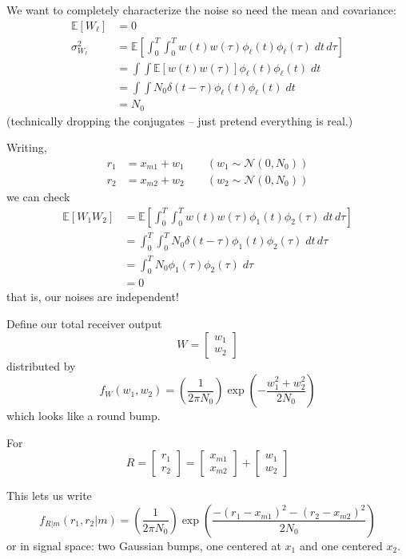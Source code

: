\documentclass[12pt]{report}
\newcommand{\E}{\mathbb{E}}
\newcommand{\Nc}{\mathcal{N}}
\begin{document}
We want to completely characterize the noise so need the mean and covariance: 
\begin{align*}
    \E[W_{\ell}] &= 0\\ 
    \sigma_{W_{\ell}}^2 &= \E\left[\int_0^T \int_0^T w(t) w(\tau)\phi_{\ell}(t) \phi_{\ell}(\tau) \; dt\, d\tau\right]\\ 
    &= \int \int \E[w(t) w(\tau)] \phi_{\ell}(t) \phi_{\ell}(t)\; dt\\ 
    &= \int \int N_0 \delta(t - \tau) \phi_{\ell}(t) \phi_{\ell}(t)\; dt\\
    &= N_0
\end{align*}
(technically dropping the conjugates -- just pretend everything is real.) 

Writing, 
\begin{align*}
    r_1 &= x_{m1} + w_1 \qquad (w_1 \sim \Nc(0, N_0))\\ 
    r_2 &= x_{m2} + w_2 \qquad (w_2 \sim \Nc(0, N_0))
\end{align*}
we can check 
\begin{align*}
    \E[W_1 W_2] &= \E\left[\int_0^T \int_0^T w(t) w(\tau) \phi_1(t) \phi_2(\tau)\; dt\, d\tau\right]\\ 
    &= \int_0^T \int_0^T N_0\delta(t - \tau) \phi_1(t) \phi_2(\tau)\; dt\, d\tau\\ 
    &= \int_0^T N_0 \phi_1(\tau) \phi_2(\tau)\; d\tau\\ 
    &= 0
\end{align*}
that is, our noises are independent!

Define our total receiver output 
\[W = \begin{bmatrix}
    w_1\\ w_2
\end{bmatrix}\]
distributed by 
\[f_W(w_1, w_2) = \left(\frac{1}{2\pi N_0}\right) \exp\left(-\frac{w_1^2 + w_2^2}{2N_0}\right)   \]
which looks like a round bump. 

For 
\[R = \begin{bmatrix}
    r_1\\ r_2
\end{bmatrix} = \begin{bmatrix}
    x_{m1}\\ x_{m2}
\end{bmatrix} + \begin{bmatrix}
    w_1\\ w_2
\end{bmatrix}\]

This lets us write 
\[f_{R | m}(r_1, r_2 | m) = \left(\frac{1}{2\pi N_0}\right) \exp\left(\frac{-(r_1 - x_{m1})^2 - (r_2 - x_{m2})^2}{2N_0}\right) \]  
or in signal space: two Gaussian bumps, one centered at $x_1$ and one centered $x_2$. 
\end{document}

